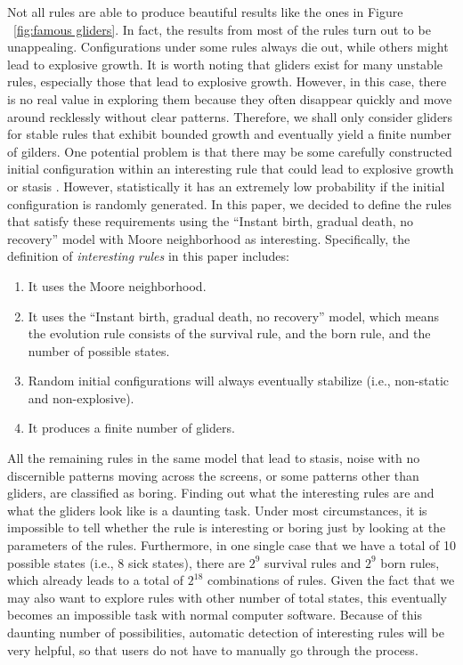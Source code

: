 \documentclass[12pt]{article}
\numberwithin{figure}{section} %
\begin{document}
Not all rules are able to produce beautiful results like the ones in Figure ~\ref{fig:famous gliders}. In fact, the results from most of the rules turn out to be unappealing. Configurations under some rules always die out, while others might lead to explosive growth. It is worth noting that gliders exist for many unstable rules, especially those that lead to explosive growth. However, in this case, there is no real value in exploring them because they often disappear quickly and move around recklessly without clear patterns. Therefore, we shall only consider gliders for stable rules that exhibit bounded growth and eventually yield a finite number of gilders. One potential problem is that there may be some carefully constructed initial configuration within an interesting rule that could lead to explosive growth or stasis \cite{Gliders in Cellular Automata}. However, statistically it has an extremely low probability if the initial configuration is randomly generated. In this paper, we decided to define the rules that satisfy these requirements using the “Instant birth, gradual death, no recovery” model with Moore neighborhood as interesting. Specifically, the definition of \textit{interesting rules} in this paper includes: 
\begin{enumerate}[topsep=0pt,itemsep=-1ex,partopsep=1ex,parsep=1ex]
\item It uses the Moore neighborhood. 
\item It uses the “Instant birth, gradual death, no recovery” model, which means the evolution rule consists of the survival rule, and the born rule, and the number of possible states. 
\item Random initial configurations will always eventually stabilize (i.e., non-static and non-explosive). 
\item It produces a finite number of gliders. 
\end{enumerate}

All the remaining rules in the same model that lead to stasis, noise with no discernible patterns moving across the screens, or some patterns other than gliders, are classified as boring. Finding out what the interesting rules are and what the gliders look like is a daunting task. Under most circumstances, it is impossible to tell whether the rule is interesting or boring just by looking at the parameters of the rules. Furthermore, in one single case that we have a total of 10 possible states (i.e., 8 sick states), there are $2^9$ survival rules and $2^9$ born rules, which already leads to a total of $2^{18}$ combinations of rules. Given the fact that we may also want to explore rules with other number of total states, this eventually becomes an impossible task with normal computer software. Because of this daunting number of possibilities, automatic detection of interesting rules will be very helpful, so that users do not have to manually go through the process. 
\end{document}
